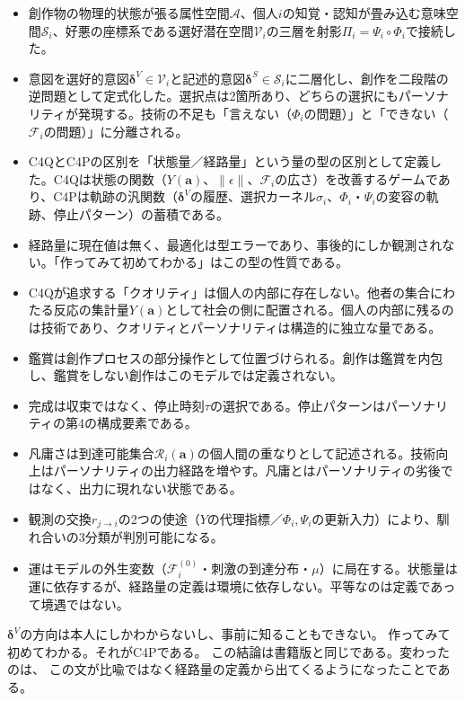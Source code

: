 \documentclass[a4paper, fontsize=10pt]{jlreq}
\newcommand{\va}{\bm{a}}
\newcommand{\A}{\mathcal{A}}
\newcommand{\Si}{\mathcal{S}_i}
\newcommand{\Vi}{\mathcal{V}_i}
\newcommand{\Phii}{\Phi_i}
\newcommand{\Psii}{\Psi_i}
\newcommand{\Fi}{\mathcal{F}_i}
\newcommand{\dV}{\bm{\delta}^{V}}          %
\newcommand{\dS}{\bm{\delta}^{S}}          %
\newcommand{\Ri}{\mathcal{R}_i}            %
\begin{document}
\begin{itemize}[leftmargin=2em]
  \item 創作物の物理的状態が張る属性空間$\A$、個人$i$の知覚・認知が畳み込む意味空間$\Si$、好悪の座標系である選好潜在空間$\Vi$の三層を射影$\Pi_i = \Psii \circ \Phii$で接続した。
  \item 意図を選好的意図$\dV \in \Vi$と記述的意図$\dS \in \Si$に二層化し、創作を二段階の逆問題として定式化した。選択点は2箇所あり、どちらの選択にもパーソナリティが発現する。技術の不足も「言えない（$\Phii$の問題）」と「できない（$\Fi$の問題）」に分離される。
  \item C4QとC4Pの区別を「状態量／経路量」という量の型の区別として定義した。C4Qは状態の関数（$Y(\va)$、$\lVert\epsilon\rVert$、$\Fi$の広さ）を改善するゲームであり、C4Pは軌跡の汎関数（$\dV$の履歴、選択カーネル$\sigma_i$、$\Phii$・$\Psii$の変容の軌跡、停止パターン）の蓄積である。
  \item 経路量に現在値は無く、最適化は型エラーであり、事後的にしか観測されない。「作ってみて初めてわかる」はこの型の性質である。
  \item C4Qが追求する「クオリティ」は個人の内部に存在しない。他者の集合にわたる反応の集計量$Y(\va)$として社会の側に配置される。個人の内部に残るのは技術であり、クオリティとパーソナリティは構造的に独立な量である。
  \item 鑑賞は創作プロセスの部分操作として位置づけられる。創作は鑑賞を内包し、鑑賞をしない創作はこのモデルでは定義されない。
  \item 完成は収束ではなく、停止時刻$\tau$の選択である。停止パターンはパーソナリティの第4の構成要素である。
  \item 凡庸さは到達可能集合$\Ri(\va)$の個人間の重なりとして記述される。技術向上はパーソナリティの出力経路を増やす。凡庸とはパーソナリティの劣後ではなく、出力に現れない状態である。
  \item 観測の交換$r_{j \to i}$の2つの使途（$Y$の代理指標／$\Phii, \Psii$の更新入力）により、馴れ合いの3分類が判別可能になる。
  \item 運はモデルの外生変数（$\Fi^{(0)}$・刺激の到達分布・$\mu$）に局在する。状態量は運に依存するが、経路量の定義は環境に依存しない。平等なのは定義であって境遇ではない。
\end{itemize}

$\dV$の方向は本人にしかわからないし、事前に知ることもできない。
作ってみて初めてわかる。それがC4Pである。
この結論は書籍版と同じである。変わったのは、
この文が比喩ではなく経路量の定義から出てくるようになったことである。

\clearpage
\end{document}
